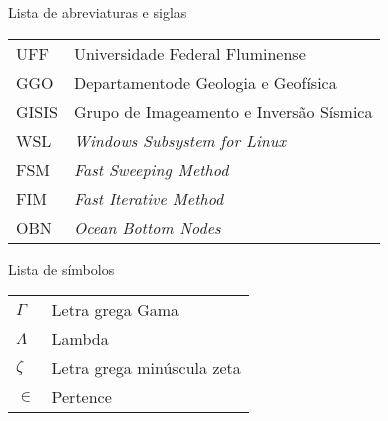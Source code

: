 \listoffigures*
\cleardoublepage

\listoftables*
\cleardoublepage

\begin{center}
\fonteLista Lista de abreviaturas e siglas 
\end{center}

\vspace{2cm}
\fonteNormalSize
\begin{tabular}{l l}
    UFF & Universidade Federal Fluminense \\ [1.0ex]
    GGO & Departamentode Geologia e Geofísica \\ [1.0ex]
    GISIS & Grupo de Imageamento e Inversão Sísmica \\ [1.0ex]
	WSL & \textit{Windows Subsystem for Linux} \\ [1.0ex]
	FSM & \textit{Fast Sweeping Method} \\ [1.0ex]
	FIM & \textit{Fast Iterative Method} \\ [1.0ex]
	OBN & \textit{Ocean Bottom Nodes}
\end{tabular}
\cleardoublepage


\begin{center}
    \fonteLista Lista de símbolos
\end{center}

\vspace{2cm}
\fonteNormalSize
\begin{tabular}{l l}
    $ \Gamma $ & Letra grega Gama \\ [1.0ex]
    $ \Lambda $ & Lambda \\ [1.0ex]
    $ \zeta $ & Letra grega minúscula zeta \\ [1.0ex]
    $ \in $ & Pertence
\end{tabular}

    
